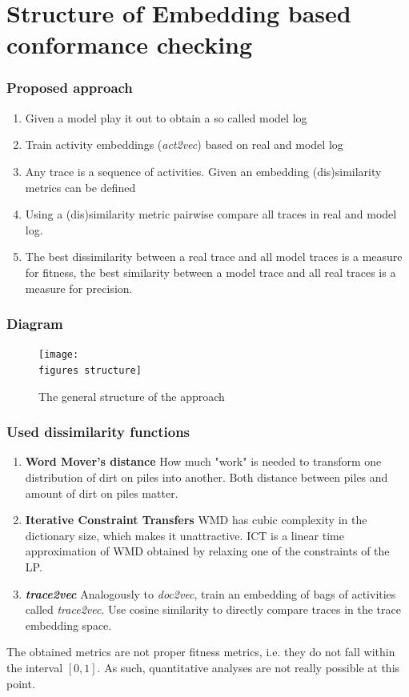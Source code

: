 \documentclass{beamer}
\newcommand{\figures}{../figures/}
\begin{document}
	\section{Structure of Embedding based conformance checking}
\begin{frame}
	\frametitle{Proposed approach}
	\begin{enumerate}
		\item Given a model play it out to obtain a so called model log
		\item Train activity embeddings (\emph{act2vec}) based on real and model log
		\item Any trace is a sequence of activities. Given an embedding (dis)similarity metrics can be defined
		\item Using a (dis)similarity metric pairwise compare all traces in real and model log.
		\item The best dissimilarity between a real trace and all model traces is a measure for fitness, the best similarity between a model trace and all real traces is a measure for precision.
	\end{enumerate}
\end{frame}
	
	
	\begin{frame}
		\frametitle{Diagram}
		\begin{figure}
			\texttt{[image: \\figures structure]}
			\caption{The general structure of the approach}
			\label{fig:structure}
		\end{figure}
	\end{frame}
	
	
	\begin{frame}
		\frametitle{Used dissimilarity functions}
		\begin{enumerate}
			\item \textbf{Word Mover's distance} How much "work" is needed to transform one distribution of dirt on piles into another. Both distance between piles and amount of dirt on piles matter.
			\item \textbf{Iterative Constraint Transfers} WMD has cubic complexity in the dictionary size, which makes it unattractive. ICT is a linear time approximation of WMD obtained by relaxing one of the constraints of the LP.
			\item \textbf{\emph{trace2vec}} Analogously to \emph{doc2vec}, train an embedding of bags of activities called \emph{trace2vec}. Use cosine similarity to directly compare traces in the trace embedding space.
		\end{enumerate}
	\alert{The obtained metrics are not proper fitness metrics, i.e. they do not fall within the interval $[0,1]$. As such, quantitative analyses are not really possible at this point.}
	\end{frame}
	
\end{document}
